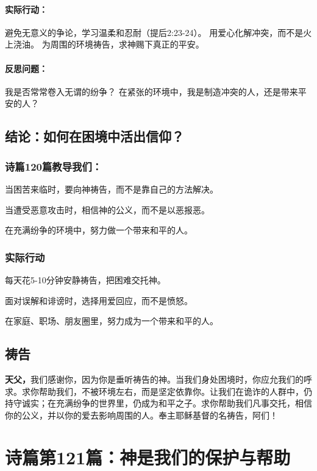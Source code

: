 \documentclass[a4paper, 12pt]{article}
\begin{document}
\paragraph*{实际行动：}

避免无意义的争论，学习温柔和忍耐（提后2:23-24）。
用爱心化解冲突，而不是火上浇油。
为周围的环境祷告，求神赐下真正的平安。
\paragraph*{反思问题：}

我是否常常卷入无谓的纷争？
在紧张的环境中，我是制造冲突的人，还是带来平安的人？
\subsection*{结论：如何在困境中活出信仰？}
\subsubsection*{诗篇120篇教导我们：}

\hspace{0.6cm}当困苦来临时，要向神祷告，而不是靠自己的方法解决。

当遭受恶意攻击时，相信神的公义，而不是以恶报恶。

在充满纷争的环境中，努力做一个带来和平的人。
\subsubsection*{实际行动}
\hspace{0.6cm}每天花5-10分钟安静祷告，把困难交托神。

面对误解和诽谤时，选择用爱回应，而不是愤怒。

在家庭、职场、朋友圈里，努力成为一个带来和平的人。


\subsection*{祷告}
\textbf{天父，}我们感谢你，因为你是垂听祷告的神。当我们身处困境时，你应允我们的呼求。求你帮助我们，不被环境左右，而是坚定依靠你。让我们在诡诈的人群中，仍持守诚实；在充满纷争的世界里，仍成为和平之子。求你帮助我们凡事交托，相信你的公义，并以你的爱去影响周围的人。奉主耶稣基督的名祷告，阿们！
\newpage
\section{诗篇第121篇：神是我们的保护与帮助}
\end{document}
